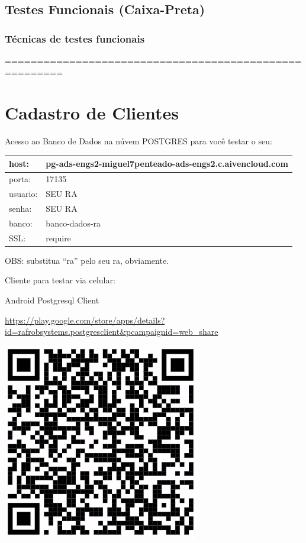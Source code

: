 \documentclass[
]{book}
\begin{document}
\subsection{Testes Funcionais (Caixa-Preta)}\label{testes-funcionais-caixa-preta}

\subsubsection{Técnicas de testes funcionais}\label{tuxe9cnicas-de-testes-funcionais}

=======================================================

\section{Cadastro de Clientes}\label{cadastro-de-clientes}

Acesso ao Banco de Dados na núvem POSTGRES para você testar o seu:

\begin{longtable}[]{@{}ll@{}}
\toprule\noalign{}
host: & pg-ads-engs2-miguel7penteado-ads-engs2.c.aivencloud.com \\
\midrule\noalign{}
\endhead
\bottomrule\noalign{}
\endlastfoot
porta: & 17135 \\
usuario: & SEU RA \\
senha: & SEU RA \\
banco: & banco-dados-ra \\
SSL: & require \\
\end{longtable}

OBS: substitua ``ra'' pelo seu ra, obviamente.

Cliente para testar via celular:

Android Postgresql Client

\url{https://play.google.com/store/apps/details?id=rafrobsystems.postgresclient&pcampaignid=web_share}

\includegraphics{images/clipboard-78059825.png}
\end{document}
